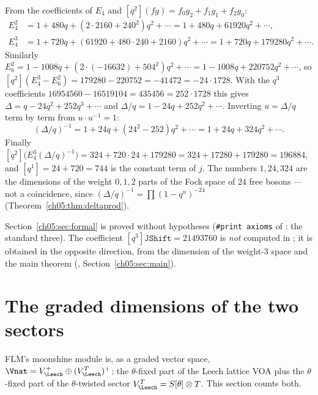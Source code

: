 \begin{example}\label{ch05:ex:196884}
From the coefficients of $E_4$ and $[q^2](fg) = f_0g_2 + f_1g_1 + f_2g_0$:
\begin{align*}
  E_4^2 &= 1 + 480q + (2\cdot2160 + 240^2)q^2 + \cdots = 1 + 480q + 61920q^2+\cdots,\\
  E_4^3 &= 1 + 720q + (61920 + 480\cdot240 + 2160)q^2+\cdots = 1 + 720q + 179280q^2 + \cdots.
\end{align*}
Similarly $E_6^2 = 1 - 1008q + (2\cdot(-16632) + 504^2)q^2+\cdots = 1 - 1008q + 220752q^2+\cdots$, so
$[q^2](E_4^3 - E_6^2) = 179280 - 220752 = -41472 = -24\cdot1728$. With the $q^3$ coefficients
$16954560 - 16519104 = 435456 = 252\cdot1728$ this gives $\Delta = q - 24q^2 + 252q^3+\cdots$ and $\Delta/q
= 1 - 24q + 252q^2+\cdots$. Inverting $u = \Delta/q$ term by term from $u\cdot u^{-1} = 1$:
\begin{equation*}
  (\Delta/q)^{-1} = 1 + 24q + (24^2 - 252)q^2 + \cdots = 1 + 24q + 324q^2 + \cdots .
\end{equation*}
Finally $[q^2]\bigl(E_4^3(\Delta/q)^{-1}\bigr) = 324 + 720\cdot24 + 179280 = 324 + 17280 + 179280 =
196884$, and $[q^1] = 24 + 720 = 744$ is the constant term of $j$. The numbers $1, 24, 324$ are the
dimensions of the weight $0,1,2$ parts of the Fock space of $24$ free bosons --- not a coincidence,
since $(\Delta/q)^{-1} = \prod(1-q^n)^{-24}$ (Theorem~\ref{ch05:thm:deltaprod}).
\end{example}

\begin{status}
Section~\ref{ch05:sec:formal} is proved without hypotheses (\texttt{\#print axioms} of
: the standard three). The coefficient $[q^3]\mathtt{JShift} = 21493760$ is
\emph{not} computed in ; it is obtained in the opposite direction, from the
dimension of the weight-$3$ space and the main theorem (,
Section~\ref{ch05:sec:main}).
\end{status}

\section{The graded dimensions of the two sectors}\label{ch05:sec:twisted}

FLM's moonshine module is, as a graded vector space, $\Vnat = V_\Leech^+ \oplus (V_\Leech^T)^+$: the
$\theta$-fixed part of the Leech lattice VOA plus the $\theta$-fixed part of the $\theta$-twisted sector
$V_\Leech^T = S[\theta]\otimes T$. This section counts both.


